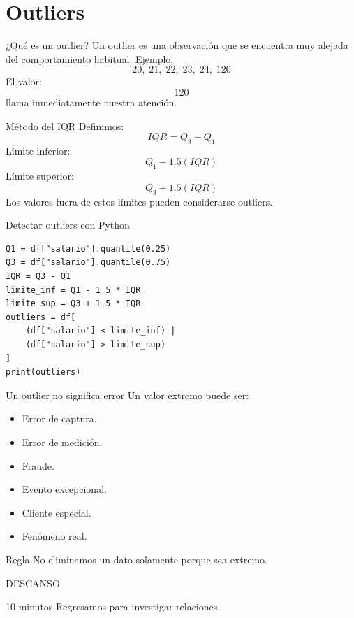 \documentclass[aspectratio=169,11pt]{beamer}
\begin{document}
\section{Outliers}
\begin{frame}{¿Qué es un outlier?}
Un outlier es una observación que se encuentra muy alejada del comportamiento habitual.
Ejemplo:
\[
20,\;21,\;22,\;23,\;24,\;120
\]
El valor:
\[
120
\]
llama inmediatamente nuestra atención.
\end{frame}
\begin{frame}{Método del IQR}
Definimos:
\[
IQR=Q_3-Q_1
\]
Límite inferior:
\[
Q_1-1.5(IQR)
\]
Límite superior:
\[
Q_3+1.5(IQR)
\]
Los valores fuera de estos límites pueden considerarse outliers.
\end{frame}
\begin{frame}[fragile]{Detectar outliers con Python}
\begin{lstlisting}
Q1 = df["salario"].quantile(0.25)
Q3 = df["salario"].quantile(0.75)
IQR = Q3 - Q1
limite_inf = Q1 - 1.5 * IQR
limite_sup = Q3 + 1.5 * IQR
outliers = df[
    (df["salario"] < limite_inf) |
    (df["salario"] > limite_sup)
]
print(outliers)
\end{lstlisting}
\end{frame}
\begin{frame}{Un outlier no significa error}
Un valor extremo puede ser:
\begin{itemize}
    \item Error de captura.
    \item Error de medición.
    \item Fraude.
    \item Evento excepcional.
    \item Cliente especial.
    \item Fenómeno real.
\end{itemize}
\begin{alertblock}{Regla}
No eliminamos un dato solamente porque sea extremo.
\end{alertblock}
\end{frame}
\begin{frame}{DESCANSO}
\begin{center}
\Huge 10 minutos
\vspace{0.5cm}
\Large
Regresamos para investigar relaciones.
\end{center}
\end{frame}
\end{document}

